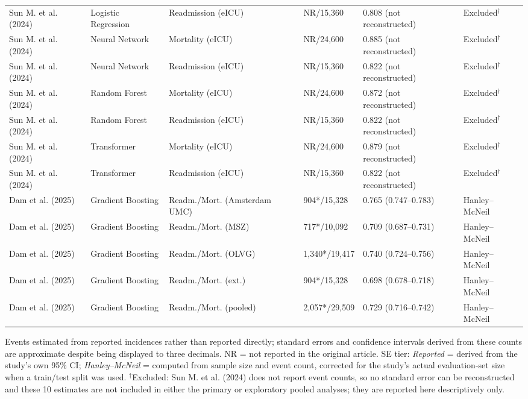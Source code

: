 \begin{table}[H]
\begin{adjustbox}{max width=\textwidth}
\begin{tabular}{llllll}
    Sun M. et al. (2024) & Logistic Regression & Readmission (eICU) & NR/15,360 & 0.808 (not reconstructed) & Excluded$^\dagger$ \\
    Sun M. et al. (2024) & Neural Network & Mortality (eICU) & NR/24,600 & 0.885 (not reconstructed) & Excluded$^\dagger$ \\
    Sun M. et al. (2024) & Neural Network & Readmission (eICU) & NR/15,360 & 0.822 (not reconstructed) & Excluded$^\dagger$ \\
    Sun M. et al. (2024) & Random Forest & Mortality (eICU) & NR/24,600 & 0.872 (not reconstructed) & Excluded$^\dagger$ \\
    Sun M. et al. (2024) & Random Forest & Readmission (eICU) & NR/15,360 & 0.822 (not reconstructed) & Excluded$^\dagger$ \\
    Sun M. et al. (2024) & Transformer & Mortality (eICU) & NR/24,600 & 0.879 (not reconstructed) & Excluded$^\dagger$ \\
    Sun M. et al. (2024) & Transformer & Readmission (eICU) & NR/15,360 & 0.822 (not reconstructed) & Excluded$^\dagger$ \\
    Dam et al. (2025) & Gradient Boosting & Readm./Mort. (Amsterdam UMC) & 904*/15,328 & 0.765 (0.747--0.783) & Hanley--McNeil \\
    Dam et al. (2025) & Gradient Boosting & Readm./Mort. (MSZ) & 717*/10,092 & 0.709 (0.687--0.731) & Hanley--McNeil \\
    Dam et al. (2025) & Gradient Boosting & Readm./Mort. (OLVG) & 1,340*/19,417 & 0.740 (0.724--0.756) & Hanley--McNeil \\
    Dam et al. (2025) & Gradient Boosting & Readm./Mort. (ext.) & 904*/15,328 & 0.698 (0.678--0.718) & Hanley--McNeil \\
    Dam et al. (2025) & Gradient Boosting & Readm./Mort. (pooled) & 2,057*/29,509 & 0.729 (0.716--0.742) & Hanley--McNeil \\
\bottomrule
\end{tabular}
\end{adjustbox}
\par\vspace{0.4em}\footnotesize * Events estimated from reported incidences rather than reported directly; standard errors and confidence intervals derived from these counts are approximate despite being displayed to three decimals. NR = not reported in the original article. SE tier: \emph{Reported} = derived from the study's own 95\% CI; \emph{Hanley--McNeil} = computed from sample size and event count, corrected for the study's actual evaluation-set size when a train/test split was used. $^\dagger$Excluded: Sun M. et al. (2024) does not report event counts, so no standard error can be reconstructed and these 10 estimates are not included in either the primary or exploratory pooled analyses; they are reported here descriptively only.
\end{table}
